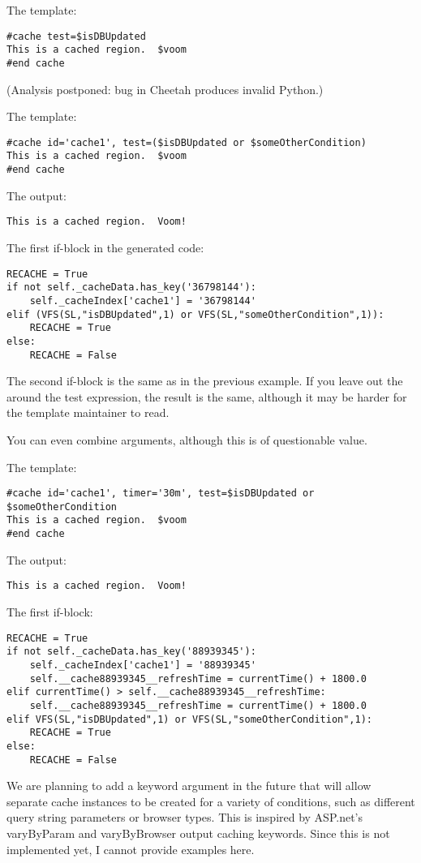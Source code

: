 The template:
\begin{verbatim}
#cache test=$isDBUpdated
This is a cached region.  $voom
#end cache
\end{verbatim}

(Analysis postponed: bug in Cheetah produces invalid Python.)




The template:
\begin{verbatim}
#cache id='cache1', test=($isDBUpdated or $someOtherCondition)
This is a cached region.  $voom
#end cache
\end{verbatim}

The output:
\begin{verbatim}
This is a cached region.  Voom!
\end{verbatim}

The first if-block in the generated code:
\begin{verbatim}
RECACHE = True
if not self._cacheData.has_key('36798144'):
    self._cacheIndex['cache1'] = '36798144'
elif (VFS(SL,"isDBUpdated",1) or VFS(SL,"someOtherCondition",1)):
    RECACHE = True
else:
    RECACHE = False
\end{verbatim}
The second if-block is the same as in the previous example.  If you leave
out the \code{()} around the test expression, the result is the same, although
it may be harder for the template maintainer to read.

You can even combine arguments, although this is of questionable value.

The template:
\begin{verbatim}
#cache id='cache1', timer='30m', test=$isDBUpdated or $someOtherCondition
This is a cached region.  $voom
#end cache
\end{verbatim}

The output:
\begin{verbatim}
This is a cached region.  Voom!
\end{verbatim}

The first if-block:
\begin{verbatim}
RECACHE = True
if not self._cacheData.has_key('88939345'):
    self._cacheIndex['cache1'] = '88939345'
    self.__cache88939345__refreshTime = currentTime() + 1800.0
elif currentTime() > self.__cache88939345__refreshTime:
    self.__cache88939345__refreshTime = currentTime() + 1800.0
elif VFS(SL,"isDBUpdated",1) or VFS(SL,"someOtherCondition",1):
    RECACHE = True
else:
    RECACHE = False
\end{verbatim}

We are planning to add a  keyword argument in the future that
will allow separate cache instances to be created for a variety of conditions,
such as different query string parameters or browser types. This is inspired by
ASP.net's varyByParam and varyByBrowser output caching keywords.  Since this is
not implemented yet, I cannot provide examples here.

